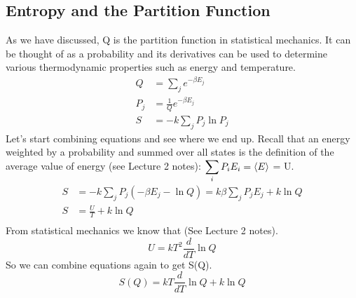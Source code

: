 \documentclass{article}
\begin{document}
\subsection*{Entropy and the Partition Function}
As we have discussed, Q is the partition function in statistical mechanics.
It can be thought of as a probability and its derivatives can be used to determine various thermodynamic properties such as energy and temperature. 
\begin{equation}
\begin{split}
    Q &= \sum_j e^{-\beta E_j} \\
    P_j &= \frac{1}{Q}e^{-\beta E_j} \\
    S &= -k \sum_j P_j\ln P_j
\end{split}
\end{equation}
Let's start combining equations and see where we end up. 
Recall that an energy weighted by a probability and summed over all states is the definition of the average value of energy (see Lecture 2 notes): $\displaystyle \sum_i P_iE_i = \braket{E}$ = U.
\begin{equation}
\begin{split}
    S &= -k \sum_j P_j (-\beta E_j - \ln Q ) = k\beta \sum_j P_j E_j + k\ln Q \\ 
    S &= \frac{U}{T} + k\ln Q \\ 
    \end{split}
\end{equation}
From statistical mechanics we know that (See Lecture 2 notes).
\begin{equation}
    U = kT^2 \frac{d}{dT}\ln Q
\end{equation}
So we can combine equations again to get S(Q).
\begin{equation}
    S(Q) = kT \frac{d}{dT}\ln Q + k\ln Q
\end{equation}
\end{document}
